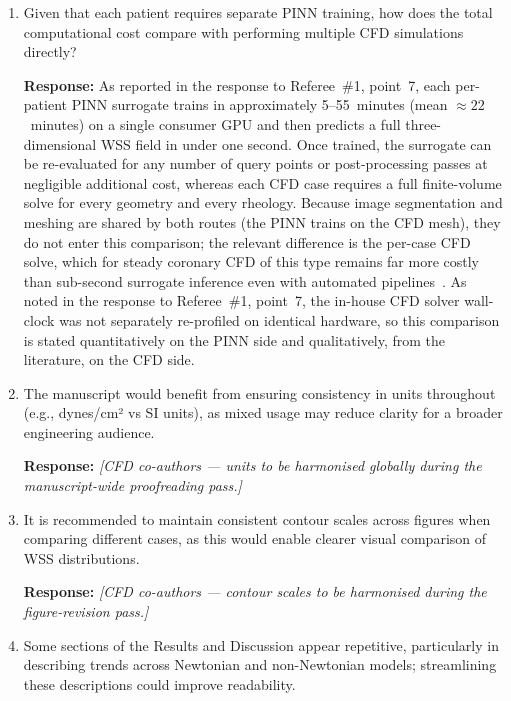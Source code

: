 \documentclass[11pt]{article}
\begin{document}
\begin{enumerate}[]
    \item Given that each patient requires separate PINN training, how does the total computational cost compare with performing multiple CFD simulations directly?

    \textbf{Response:} As reported in the response to Referee~\#1, point~7, each per-patient PINN surrogate trains in approximately 5--55~minutes (mean $\approx22$~minutes) on a single consumer GPU and then predicts a full three-dimensional WSS field in under one second. Once trained, the surrogate can be re-evaluated for any number of query points or post-processing passes at negligible additional cost, whereas each CFD case requires a full finite-volume solve for every geometry and every rheology. Because image segmentation and meshing are shared by both routes (the PINN trains on the CFD mesh), they do not enter this comparison; the relevant difference is the per-case CFD solve, which for steady coronary CFD of this type remains far more costly than sub-second surrogate inference even with automated pipelines~\cite{Nannini2024}. As noted in the response to Referee~\#1, point~7, the in-house CFD solver wall-clock was not separately re-profiled on identical hardware, so this comparison is stated quantitatively on the PINN side and qualitatively, from the literature, on the CFD side.

    \item The manuscript would benefit from ensuring consistency in units throughout (e.g., dynes/cm² vs SI units), as mixed usage may reduce clarity for a broader engineering audience.

    \textbf{Response:} \textit{[CFD co-authors --- units to be harmonised globally during the manuscript-wide proofreading pass.]}
    \vspace{1cm}

    \item It is recommended to maintain consistent contour scales across figures when comparing different cases, as this would enable clearer visual comparison of WSS distributions.

    \textbf{Response:} \textit{[CFD co-authors --- contour scales to be harmonised during the figure-revision pass.]}
    \vspace{1cm}

    \item Some sections of the Results and Discussion appear repetitive, particularly in describing trends across Newtonian and non-Newtonian models; streamlining these descriptions could improve readability.


\end{enumerate}
\end{document}
